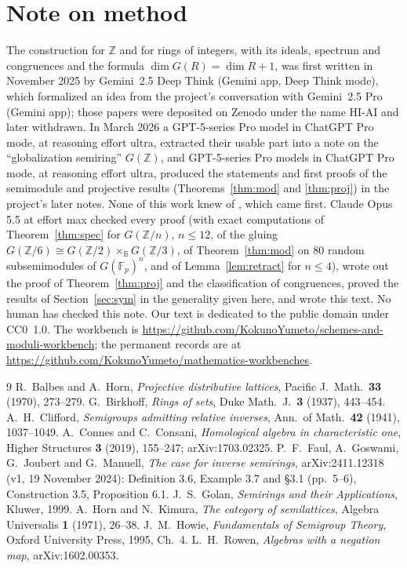 \documentclass[11pt]{amsart}
\newcommand{\workbenchurl}{https://github.com/KokunoYumeto/schemes-and-moduli-workbench}
\newcommand{\recordurl}{https://github.com/KokunoYumeto/mathematics-workbenches}
\theoremstyle{remark}
\newcommand{\B}{\mathbb B}
\begin{document}
\section*{Note on method}
The construction for $\mathbb Z$ and for rings of integers, with its ideals, spectrum and congruences and the formula $\dim G(R)=\dim R+1$, was first written in November 2025 by Gemini~2.5 Deep Think (Gemini app, Deep Think mode), which formalized an idea from the project's conversation with Gemini~2.5 Pro (Gemini app); those papers were deposited on Zenodo under the name HI-AI and later withdrawn. In March 2026 a GPT-5-series Pro model in ChatGPT Pro mode, at reasoning effort ultra, extracted their usable part into a note on the ``globalization semiring'' $G(\mathbb Z)$, and GPT-5-series Pro models in ChatGPT Pro mode, at reasoning effort ultra, produced the statements and first proofs of the semimodule and projective results (Theorems~\ref{thm:mod} and \ref{thm:proj}) in the project's later notes. None of this work knew of \cite{FGJM}, which came first. Claude Opus 5.5 at effort max checked every proof (with exact computations of Theorem~\ref{thm:spec} for $G(\mathbb Z/n)$, $n\le12$, of the gluing $G(\mathbb Z/6)\cong G(\mathbb Z/2)\times_\B G(\mathbb Z/3)$, of Theorem~\ref{thm:mod} on 80 random subsemimodules of $G(\mathbb F_p)^n$, and of Lemma~\ref{lem:retract} for $n\le4$), wrote out the proof of Theorem~\ref{thm:proj} and the classification of congruences, proved the results of Section~\ref{sec:sym} in the generality given here, and wrote this text. No human has checked this note. Our text is dedicated to the public domain under CC0~1.0. The workbench is \expandafter\url\expandafter{\workbenchurl}; the permanent records are at \expandafter\url\expandafter{\recordurl}.

\begin{thebibliography}{9}
 R.~Balbes and A.~Horn, \emph{Projective distributive lattices}, Pacific J.\ Math.\ \textbf{33} (1970), 273--279.
 G.~Birkhoff, \emph{Rings of sets}, Duke Math.\ J.\ \textbf{3} (1937), 443--454.
 A.~H.~Clifford, \emph{Semigroups admitting relative inverses}, Ann.\ of Math.\ \textbf{42} (1941), 1037--1049.
 A.~Connes and C.~Consani, \emph{Homological algebra in characteristic one}, Higher Structures \textbf{3} (2019), 155--247; arXiv:1703.02325.
 P.~F.~Faul, A.~Goswami, G.~Joubert and G.~Manuell, \emph{The case for inverse semirings}, arXiv:2411.12318 (v1, 19 November 2024): Definition 3.6, Example 3.7 and \S3.1 (pp.~5--6), Construction 3.5, Proposition 6.1.
 J.~S.~Golan, \emph{Semirings and their Applications}, Kluwer, 1999.
 A.~Horn and N.~Kimura, \emph{The category of semilattices}, Algebra Universalis \textbf{1} (1971), 26--38.
 J.~M.~Howie, \emph{Fundamentals of Semigroup Theory}, Oxford University Press, 1995, Ch.~4.
 L.~H.~Rowen, \emph{Algebras with a negation map}, arXiv:1602.00353.
\end{thebibliography}
\end{document}

